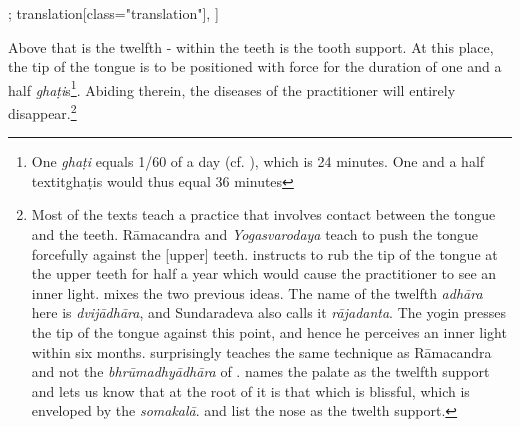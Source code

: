 \begin{alignment}[
  texts=edition[class="edition"];
  translation[class="translation"],
  ]
\begin{translation}
\begin{tlate}[p30_04]
      Above that is the twelfth - within the teeth is the tooth support. At this place, the tip of the tongue is to be positioned with force for the duration of one and a half \textit{ghaṭi}s\footnote{One \textit{ghaṭi} equals 1/60 of a day (cf. \citeauthor[1966: 114]{sircar1966}), which is 24 minutes. One and a half textit{ghaṭi}s would thus equal 36 minutes}. Abiding therein, the diseases of the practitioner will entirely disappear.\footnote{Most of the texts teach a practice that involves contact between the tongue and the teeth. Rāmacandra and \textit{Yogasvarodaya} teach to push the tongue forcefully against the [upper] teeth.  instructs to rub the tip of the tongue at the upper teeth for half a year which would cause the practitioner to see an inner light.  mixes the two previous ideas. The name of the twelfth \textit{adhāra} here is \textit{dvijādhāra}, and Sundaradeva also calls it \textit{rājadanta}. The yogin presses the tip of the tongue against this point, and hence he perceives an inner light within six months.  surprisingly teaches the same technique as Rāmacandra and not the \textit{bhrūmadhyādhāra} of .  names the palate as the twelfth support and lets us know that at the root of it is that which is blissful, which is enveloped by the \textit{somakalā}.  and  list the nose as the twelth support.}    
\flushpage 
      \end{tlate}
  \end{translation}
\end{alignment}
\pagebreak %
